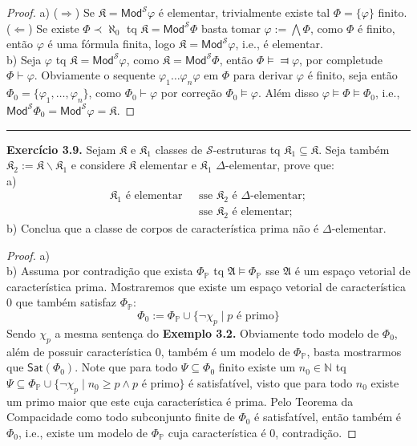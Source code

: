\documentclass[11pt]{article}
\newcommand{\mc}[1]{\mathcal{#1}}
\newcommand{\mf}[1]{\mathfrak{#1}}
\newcommand{\msf}[1]{\mathsf{#1}}
\newcommand{\mbb}[1]{\mathbb{#1}}
\begin{document}
\begin{proof}
    a) ($\Rightarrow$) Se $\mf{K}=\msf{Mod}^\mc{S}\varphi$ é elementar, trivialmente existe tal $\Phi=\{\varphi\}$ finito.\\
    ($\Leftarrow$) Se existe $\Phi\prec\aleph_0$ tq $\mf{K}=\msf{Mod}^\mc{S}\Phi$ basta tomar $\varphi:=\bigwedge\Phi$, como $\Phi$ é finito, então $\varphi$ é uma fórmula finita, logo $\mf{K}=\msf{Mod}^\mc{S}\varphi$, i.e., é elementar.\\
    b) Seja $\varphi$ tq $\mf{K}=\msf{Mod}^\mc{S}\varphi$, como $\mf{K}=\msf{Mod}^\mc{S}\Phi$, então $\Phi\vDash\Dashv\varphi$, por completude $\Phi\vdash\varphi$. Obviamente o sequente $\varphi_1\dots\varphi_n\varphi$ em $\Phi$ para derivar $\varphi$ é finito, seja então $\Phi_0=\{\varphi_1,\dots,\varphi_n\}$, como $\Phi_0\vdash\varphi$ por correção $\Phi_0\vDash\varphi$. Além disso $\varphi\vDash\Phi\vDash\Phi_0$, i.e., $\msf{Mod}^\mc{S}\Phi_0=\msf{Mod}^\mc{S}\varphi=\mf{K}$.
\end{proof}

\hrule

\begin{shaded}
\textbf{Exercício 3.9.} Sejam $\mf{K}$ e $\mf{K}_1$ classes de $\mc{S}$-estruturas tq $\mf{K}_1\subseteq\mf{K}$. Seja também $\mf{K}_2:=\mf{K}\backslash\mf{K}_1$ e considere $\mf{K}$ elementar e $\mf{K}_1$ $\Delta$-elementar, prove que:\\
a)
\begin{align*}
    \mf{K}_1\text{ é elementar }&\text{ sse }\mf{K}_2\text{ é }\Delta\text{-elementar};\\
    &\text{ sse }\mf{K}_2\text{ é elementar};
\end{align*}
b) Conclua que a classe de corpos de característica prima não é $\Delta$-elementar.
\end{shaded}

\begin{proof}
    a) \textbf{\color{red}{PENDENTE}}\\
    b) Assuma por contradição que exista $\Phi_\mbb{P}$ tq $\mf{A}\vDash\Phi_\mbb{P}$ sse $\mf{A}$ é um espaço vetorial de característica prima. Mostraremos que existe um espaço vetorial de característica $0$ que também satisfaz $\Phi_\mbb{P}$:
    $$\Phi_0:=\Phi_\mbb{P}\cup\{\neg\chi_p\mid p\text{ é primo}\}$$
    Sendo $\chi_p$ a mesma sentença do \textbf{Exemplo 3.2.} Obviamente todo modelo de $\Phi_0$, além de possuir característica $0$, também é um modelo de $\Phi_\mbb{P}$, basta mostrarmos que $\msf{Sat}(\Phi_0)$. Note que para todo $\Psi\subseteq\Phi_0$ finito existe um $n_0\in\mbb{N}$ tq $\Psi\subseteq\Phi_\mbb{P}\cup\{\neg\chi_p\mid n_0\ge p\wedge p\text{ é primo}\}$ é satisfatível, visto que para todo $n_0$ existe um primo maior que este cuja característica é prima. Pelo Teorema da Compacidade como todo subconjunto finite de $\Phi_0$ é satisfatível, então também é $\Phi_0$, i.e., existe um modelo de $\Phi_\mbb{P}$ cuja característica é $0$, contradição. 
\end{proof}
\end{document}
